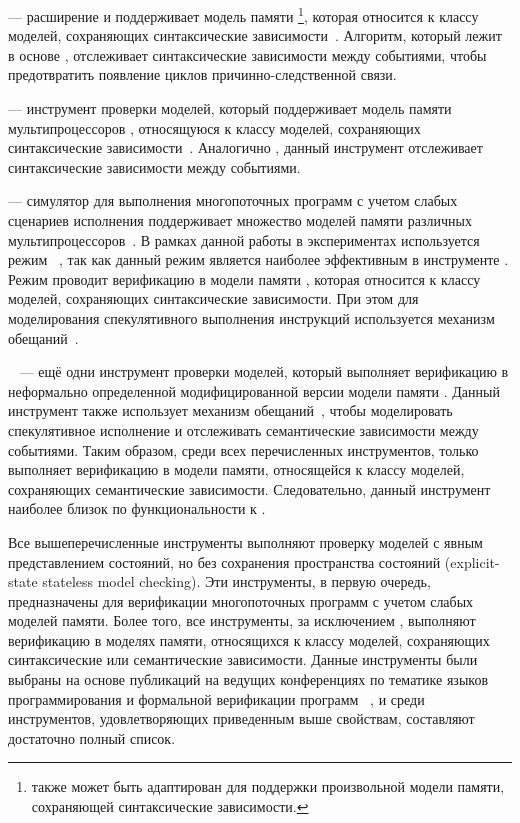 \textbf{\hmc} --- 
расширение \genmc и поддерживает  модель памяти \IMM
\footnote{\hmc также может быть адаптирован для поддержки 
  произвольной модели памяти, сохраняющей синтаксические зависимости.},
которая относится к классу моделей, сохраняющих синтаксические зависимости~\cite{Kokologiannakis-Vafeiadis:ASPLOS2020}.  
Алгоритм, который лежит в основе \hmc, отслеживает синтаксические зависимости между событиями, 
чтобы предотвратить появление циклов причинно-следственной связи. 

 \textbf{\Nidhugg} --- инструмент проверки моделей, который поддерживает модель памяти мультипроцессоров \POWER, 
относящуюся к классу моделей, сохраняющих синтаксические зависимости~\cite{Abdulla-al:TACAS2015,Abdulla-al:CAV2016}.  
Аналогично \hmc, данный инструмент отслеживает синтаксические зависимости между событиями.

\textbf{\rmem} --- симулятор для выполнения многопоточных программ с учетом слабых сценариев исполнения  поддерживает множество моделей памяти различных мультипроцессоров~\cite{RMEM}. 
В рамках данной работы в экспериментах используется режим \PrmARM%
~\cite{Pulte-al:PLDI2019}, так как данный режим является 
наиболее эффективным в инструменте \rmem.
Режим \PrmARM проводит верификацию в модели памяти , 
которая относится к классу моделей, сохраняющих синтаксические зависимости. 
При этом для моделирования спекулятивного выполнения инструкций 
используется механизм обещаний~\cite{Kang-al:POPL17}.  

\textbf{\CDSChecker}~\cite{Norris-Demsky:OOPSLA2013} --- 
ещё одни инструмент проверки моделей, который выполняет  верификацию 
в неформально определенной модифицированной версии модели памяти \CMM.
Данный инструмент также использует механизм обещаний~\cite{Kang-al:POPL17}, 
чтобы моделировать спекулятивное исполнение и отслеживать
семантические зависимости между событиями. 
Таким образом, среди всех перечисленных инструментов,
только \CDSChecker выполняет верификацию в модели памяти, 
относящейся к классу моделей, сохраняющих семантические зависимости. 
Следовательно, данный инструмент наиболее близок по функциональности к \wmc.

Все вышеперечисленные инструменты выполняют проверку 
моделей с явным представлением состояний, 
но без сохранения пространства состояний (explicit-state stateless model checking). 
Эти инструменты, в первую очередь, предназначены 
для верификации многопоточных программ с учетом слабых моделей памяти. 
Более того, все инструменты, за исключением \genmc, выполняют верификацию 
в моделях памяти, относящихся к классу моделей, 
сохраняющих синтаксические или семантические зависимости. 
Данные инструменты были выбраны на основе публикаций 
на ведущих конференциях по тематике языков программирования 
и формальной верификации программ%
~\cite{Kokologiannakis:PLDI2019,Kokologiannakis:CAD2021,Kokologiannakis-Vafeiadis:ASPLOS2020,
Abdulla-al:TACAS2015,Abdulla-al:CAV2016,Pulte-al:PLDI2019,Norris-Demsky:OOPSLA2013}, 
и среди инструментов, удовлетворяющих приведенным выше свойствам, 
составляют достаточно полный список.


